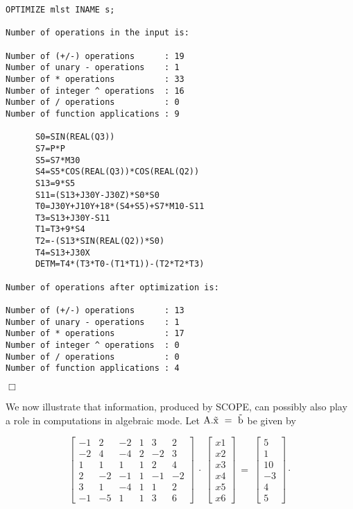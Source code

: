 {\small
\begin{verbatim}
OPTIMIZE mlst INAME s;

Number of operations in the input is:

Number of (+/-) operations      : 19
Number of unary - operations    : 1
Number of * operations          : 33
Number of integer ^ operations  : 16
Number of / operations          : 0
Number of function applications : 9

      S0=SIN(REAL(Q3))
      S7=P*P
      S5=S7*M30
      S4=S5*COS(REAL(Q3))*COS(REAL(Q2))
      S13=9*S5
      S11=(S13+J30Y-J30Z)*S0*S0
      T0=J30Y+J10Y+18*(S4+S5)+S7*M10-S11
      T3=S13+J30Y-S11
      T1=T3+9*S4
      T2=-(S13*SIN(REAL(Q2))*S0)
      T4=S13+J30X
      DETM=T4*(T3*T0-(T1*T1))-(T2*T2*T3)

Number of operations after optimization is:

Number of (+/-) operations      : 13
Number of unary - operations    : 1
Number of * operations          : 17
Number of integer ^ operations  : 0
Number of / operations          : 0
Number of function applications : 4
\end{verbatim}
\begin{flushright}
$\Box$
\end{flushright}}
\example\label{ex:3.2.6}

We now illustrate that information, produced by SCOPE, can possibly also play
a role in computations in algebraic mode.  Let ${\rm A.\vec{x}~=~\vec{b}}$
be given by

 \[ \left[ \begin{array}{rrrrrr}
                             -1 & 2  & -2 & 1 & 3 & 2 \\
                             -2 & 4  & -4 & 2 & -2 & 3 \\
                              1 & 1  &  1 & 1 & 2 & 4 \\
                              2 & -2 & -1 & 1 & -1 & -2 \\
                              3 & 1  & -4 & 1 & 1 & 2 \\
                             -1 & -5 &  1 & 1 & 3 & 6
      \end{array}\right]~\cdot~\left[ \begin{array}{c}
                                 x1 \\ x2 \\ x3 \\ x4 \\ x5 \\ x6
                               \end{array} \right]~=~
                               \left[ \begin{array}{r}
                                 5 \\ 1 \\ 10 \\ -3 \\ 4 \\ 5
                               \end{array} \right] \cdot \]

